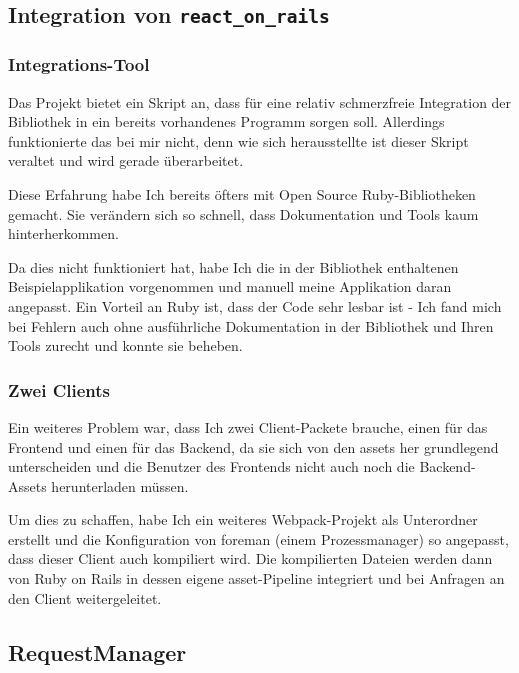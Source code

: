 \documentclass[a4paper,10pt]{scrartcl}
\begin{document}
  \subsection{Integration von \lstinline{react_on_rails}}

    \subsubsection{Integrations-Tool}

      Das Projekt bietet ein Skript an, dass für eine relativ schmerzfreie
      Integration der Bibliothek in ein bereits vorhandenes Programm sorgen
      soll.
      Allerdings funktionierte das bei mir nicht, denn wie sich herausstellte
      ist dieser Skript veraltet und wird gerade überarbeitet.

      Diese Erfahrung habe Ich bereits öfters mit Open Source Ruby-Bibliotheken
      gemacht.
      Sie verändern sich so schnell, dass Dokumentation und Tools kaum
      hinterherkommen.

      Da dies nicht funktioniert hat, habe Ich die in der Bibliothek
      enthaltenen Beispielapplikation vorgenommen und manuell meine Applikation
      daran angepasst.
      Ein Vorteil an Ruby ist, dass der Code sehr lesbar ist - Ich fand mich
      bei Fehlern auch ohne ausführliche Dokumentation in der Bibliothek und
      Ihren Tools zurecht und konnte sie beheben.

    \subsubsection{Zwei Clients}

      Ein weiteres Problem war, dass Ich zwei Client-Packete brauche, einen
      für das Frontend und einen für das Backend, da sie sich von den assets
      her grundlegend unterscheiden und die Benutzer des Frontends nicht auch
      noch die Backend-Assets herunterladen müssen.

      Um dies zu schaffen, habe Ich ein weiteres Webpack-Projekt als Unterordner
      erstellt und die Konfiguration von foreman (einem Prozessmanager) so
      angepasst, dass dieser Client auch kompiliert wird.
      Die kompilierten Dateien werden dann von Ruby on Rails in dessen eigene
      asset-Pipeline integriert und bei Anfragen an den Client weitergeleitet.

  \subsection{RequestManager}
\end{document}
